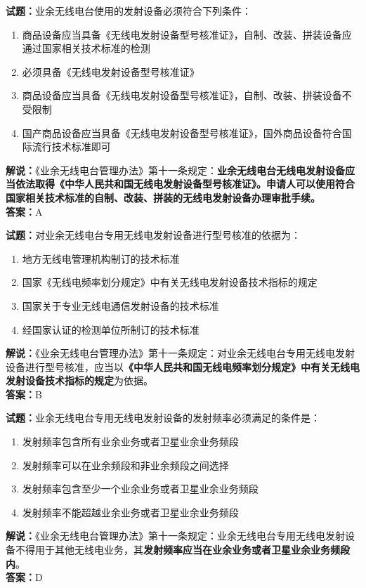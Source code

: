 \documentclass{ctexbook}
\begin{document}
\noindent\textbf{试题：}业余无线电台使用的发射设备必须符合下列条件：
\begin{enumerate}[leftmargin=3em]
  \item 商品设备应当具备《无线电发射设备型号核准证》，自制、改装、拼装设备应通过国家相关技术标准的检测
  \item 必须具备《无线电发射设备型号核准证》
  \item 商品设备应当具备《无线电发射设备型号核准证》，自制、改装、拼装设备不受限制
  \item 国产商品设备应当具备《无线电发射设备型号核准证》，国外商品设备符合国际流行技术标准即可
\end{enumerate}
\noindent\textbf{解说：}《业余无线电台管理办法》第十一条规定：\textbf{业余无线电台无线电发射设备应当依法取得《中华人民共和国无线电发射设备型号核准证》。申请人可以使用符合国家相关技术标准的自制、改装、拼装的无线电发射设备办理审批手续。}\\\noindent\textbf{答案：}A

\bigskip

\noindent\textbf{试题：}对业余无线电台专用无线电发射设备进行型号核准的依据为：
\begin{enumerate}[leftmargin=3em]
  \item 地方无线电管理机构制订的技术标准
  \item 国家《无线电频率划分规定》中有关无线电发射设备技术指标的规定
  \item 国家关于专业无线电通信发射设备的技术标准
  \item 经国家认证的检测单位所制订的技术标准
\end{enumerate}
\noindent\textbf{解说：}《业余无线电台管理办法》第十一条规定：对业余无线电台专用无线电发射设备进行型号核准，应当以\textbf{《中华人民共和国无线电频率划分规定》中有关无线电发射设备技术指标的规定}为依据。\\\noindent\textbf{答案：}B

\bigskip

\noindent\textbf{试题：}业余无线电台专用无线电发射设备的发射频率必须满足的条件是：
\begin{enumerate}[leftmargin=3em]
  \item 发射频率包含所有业余业务或者卫星业余业务频段
  \item 发射频率可以在业余频段和非业余频段之间选择
  \item 发射频率包含至少一个业余业务或者卫星业余业务频段
  \item 发射频率不能超越业余业务或者卫星业余业务频段
\end{enumerate}
\noindent\textbf{解说：}《业余无线电台管理办法》第十一条规定：业余无线电台专用无线电发射设备不得用于其他无线电业务，其\textbf{发射频率应当在业余业务或者卫星业余业务频段内}。\\\noindent\textbf{答案：}D
\end{document}
